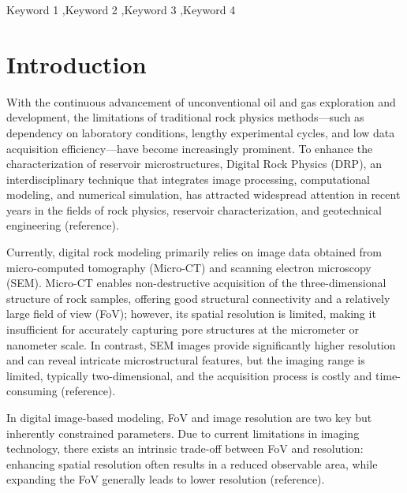 \documentclass[a4paper,fleqn]{cas-sc}
\begin{document}

\begin{keywords}
Keyword 1 \sep Keyword 2 \sep Keyword 3 \sep Keyword 4
\end{keywords}

\maketitle 

\printcredits

\doublespacing


\section{Introduction}
\label{intro}
With the continuous advancement of unconventional oil and gas exploration and development, the limitations of traditional rock physics methods---such as dependency on laboratory conditions, lengthy experimental cycles, and low data acquisition efficiency---have become increasingly prominent. To enhance the characterization of reservoir microstructures, Digital Rock Physics (DRP), an interdisciplinary technique that integrates image processing, computational modeling, and numerical simulation, has attracted widespread attention in recent years in the fields of rock physics, reservoir characterization, and geotechnical engineering (reference). %

Currently, digital rock modeling primarily relies on image data obtained from micro-computed tomography (Micro-CT) and scanning electron microscopy (SEM). Micro-CT enables non-destructive acquisition of the three-dimensional structure of rock samples, offering good structural connectivity and a relatively large field of view (FoV); however, its spatial resolution is limited, making it insufficient for accurately capturing pore structures at the micrometer or nanometer scale. In contrast, SEM images provide significantly higher resolution and can reveal intricate microstructural features, but the imaging range is limited, typically two-dimensional, and the acquisition process is costly and time-consuming (reference). %

In digital image-based modeling, FoV and image resolution are two key but inherently constrained parameters. Due to current limitations in imaging technology, there exists an intrinsic trade-off between FoV and resolution: enhancing spatial resolution often results in a reduced observable area, while expanding the FoV generally leads to lower resolution (reference). %
\end{document}
